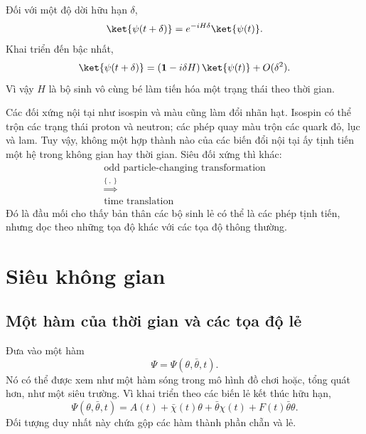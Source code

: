 Đối với một độ dời hữu hạn \(\delta\),
\begin{equation}
\ket{\psi(t+\delta)}
=e^{-iH\delta}\ket{\psi(t)}.
\end{equation}
Khai triển đến bậc nhất,
\begin{equation}
\ket{\psi(t+\delta)}
=\left(\mathbf 1-i\delta H\right)\ket{\psi(t)}
+O(\delta^2).
\end{equation}
Vì vậy \(H\) là bộ sinh vô cùng bé làm tiến hóa một trạng thái theo thời gian.

Các đối xứng nội tại như isospin và màu cũng làm đổi nhãn hạt. Isospin có thể trộn các trạng thái proton và neutron; các phép quay màu trộn các quark đỏ, lục và lam. Tuy vậy, không một hợp thành nào của các biến đổi nội tại ấy tịnh tiến một hệ trong không gian hay thời gian. Siêu đối xứng thì khác:
\begin{equation}
\begin{gathered}
\text{odd particle-changing transformation}\\
\mathrel{\stackrel{\{\ ,\ \}}{\Longrightarrow}}\\
\text{time translation}
\end{gathered}
\end{equation}
Đó là đầu mối cho thấy bản thân các bộ sinh lẻ có thể là các phép tịnh tiến, nhưng dọc theo những tọa độ khác với các tọa độ thông thường.

\section{Siêu không gian}

\subsection{Một hàm của thời gian và các tọa độ lẻ}

Đưa vào một hàm
\begin{equation}
\Psi=\Psi(\theta,\bar\theta,t).
\end{equation}
Nó có thể được xem như một hàm sóng trong mô hình đồ chơi hoặc, tổng quát hơn, như một siêu trường. Vì khai triển theo các biến lẻ kết thúc hữu hạn,
\begin{equation}
\Psi(\theta,\bar\theta,t)
=A(t)+\bar\chi(t)\theta
+\bar\theta\chi(t)+F(t)\bar\theta\theta.
\end{equation}
Đối tượng duy nhất này chứa gộp các hàm thành phần chẵn và lẻ. 

